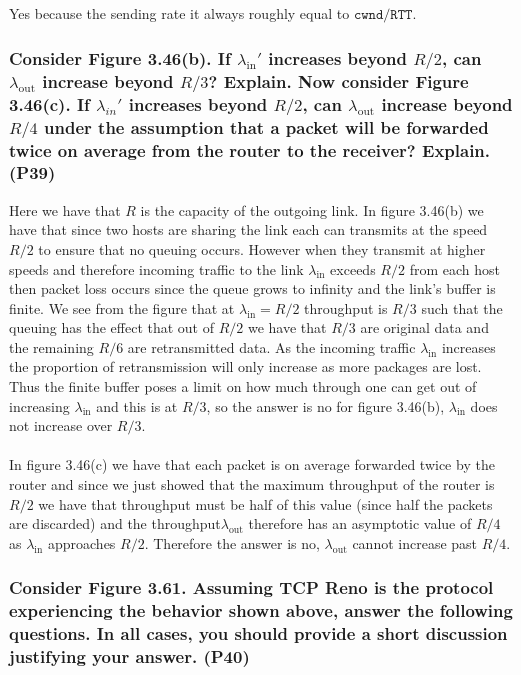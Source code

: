 Yes because the sending rate it always roughly equal to $\texttt{cwnd}/\texttt{RTT}$.



\subsubsection{Consider Figure 3.46(b). If $\lambda_\text{in}'$ increases beyond $R/2$, can $\lambda_\text{out}$ increase beyond $R/3$? Explain. Now consider Figure 3.46(c). If $\lambda_{in}'$ increases beyond $R/2$, can $\lambda_\text{out}$ increase beyond $R/4$ under the assumption that a packet will be forwarded twice on average from the router to the receiver? Explain. (P39)}

Here we have that $R$ is the capacity of the outgoing link. In figure 3.46(b) we have that since two hosts are sharing the link each can transmits at the speed $R/2$ to ensure that no queuing occurs. However when they transmit at higher speeds and therefore incoming traffic to the link $\lambda_{\text{in}}$ exceeds $R/2$ from each host then packet loss occurs since the queue grows to infinity and the link's buffer is finite. We see from the figure that at $\lambda_{\text{in}} = R/2$ throughput is $R/3$ such that the queuing has the effect that out of $R/2$ we have that $R/3$ are original data and the remaining $R/6$ are retransmitted data. As the incoming traffic $\lambda_{\text{in}}$ increases the proportion of retransmission will only increase as more packages are lost. Thus the finite buffer poses a limit on how much through one can get out of increasing $\lambda_{\text{in}}$ and this is at $R/3$, so the answer is no for figure 3.46(b), $\lambda_{\text{in}}$ does not increase over $R/3$. \\
\\
In figure 3.46(c) we have that each packet is on average forwarded twice by the router and since we just showed that the maximum throughput of the router is $R/2$ we have that throughput must be half of this value (since half the packets are discarded) and the throughput$\lambda_\text{out}$ therefore has an asymptotic value of $R/4$ as $\lambda_{\text{in}}$ approaches $R/2$. Therefore the answer is no, $\lambda_\text{out}$ cannot increase past $R/4$.



\subsubsection{Consider Figure 3.61. Assuming TCP Reno is the protocol experiencing the behavior shown above, answer the following questions. In all cases, you should provide a short discussion justifying your answer. (P40)}

